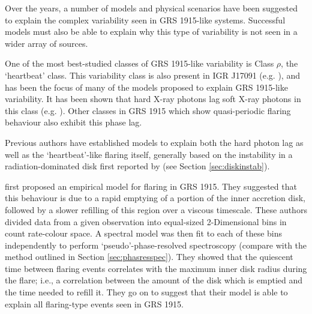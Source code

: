 \par Over the years, a number of models and physical scenarios have been suggested to explain the complex variability seen in GRS 1915-like systems.  Successful models must also be able to explain why this type of variability is not seen in a wider array of sources.
\par One of the most best-studied classes of GRS 1915-like variability is Class $\rho$, the `heartbeat' class.  This variability class is also present in IGR J17091 (e.g. \citealp{Altamirano_IGR_FH}), and has been the focus of many of the models proposed to explain GRS 1915-like variability.  It has been shown that hard X-ray photons lag soft X-ray photons in this class (e.g. \citealp{Janiuk_Lag,Massaro_Lag}).  Other classes in GRS 1915 which show quasi-periodic flaring behaviour also exhibit this phase lag.
\par Previous authors have established models to explain both the hard photon lag as well as the `heartbeat'-like flaring itself, generally based on the instability in a radiation-dominated disk first reported by \citealp{Lightman_Instability} (see Section \ref{sec:diskinstab}).
\par \citealp{Belloni_Model1} first proposed an empirical model for flaring in GRS 1915.  They suggested that this behaviour is due to a rapid emptying of a portion of the inner accretion disk, followed by a slower refilling of this region over a viscous timescale.  These authors divided data from a given observation into equal-sized 2-Dimensional bins in count rate-colour space.  A spectral model was then fit to each of these bins independently to perform `pseudo'-phase-resolved spectroscopy (compare with the method outlined in Section \ref{sec:phasresspec}).  They showed that the quiescent time between flaring events correlates with the maximum inner disk radius during the flare; i.e., a correlation between the amount of the disk which is emptied and the time needed to refill it.  They go on to suggest that their model is able to explain all flaring-type events seen in GRS 1915.
